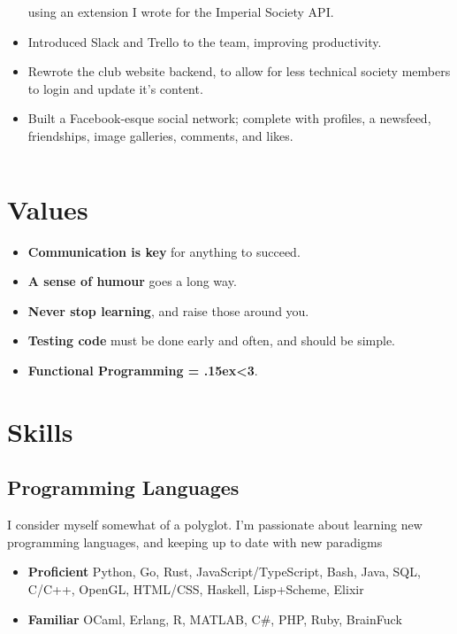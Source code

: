 \documentclass{jcgcv}
\begin{document}
\begin{column}
\begin{itemize}
          using an extension I wrote for the Imperial Society API.
    \item Introduced Slack and Trello to the team, improving productivity.
    \item Rewrote the club website backend, to allow for less technical society
          members to login and update it's content.
  \end{itemize}
  \vgap
  \begin{itemize}\setlength\itemsep{0.25em}
    \item Built a Facebook-esque social network; complete with profiles, a
          newsfeed, friendships, image galleries, comments, and likes.
  \end{itemize}

\end{column}\begin{column}

  \section{Values}
  \begin{itemize}
    \item \textbf{Communication is key} for anything to succeed.
    \item \textbf{A sense of humour} goes a long way.
    \item \textbf{Never stop learning}, and raise those around you.
    \item \textbf{Testing code} must be done early and often, and should be simple.
    \item \textbf{Functional Programming = {\raise.15ex\hbox{<}}3}.
  \end{itemize}

  \section{Skills}
  \subsection{Programming Languages}
  I consider myself somewhat of a polyglot. I'm passionate about learning new
  programming languages, and keeping up to date with new paradigms
  \begin{itemize}
    \item \textbf{Proficient} Python, Go, Rust, JavaScript/TypeScript, Bash, Java,
          SQL, C/C++, OpenGL, HTML/CSS, Haskell, Lisp+Scheme, Elixir
    \item \textbf{Familiar} OCaml, Erlang, R, MATLAB, C\#, PHP, Ruby, BrainFuck
  \end{itemize}

\end{column}
\end{document}
